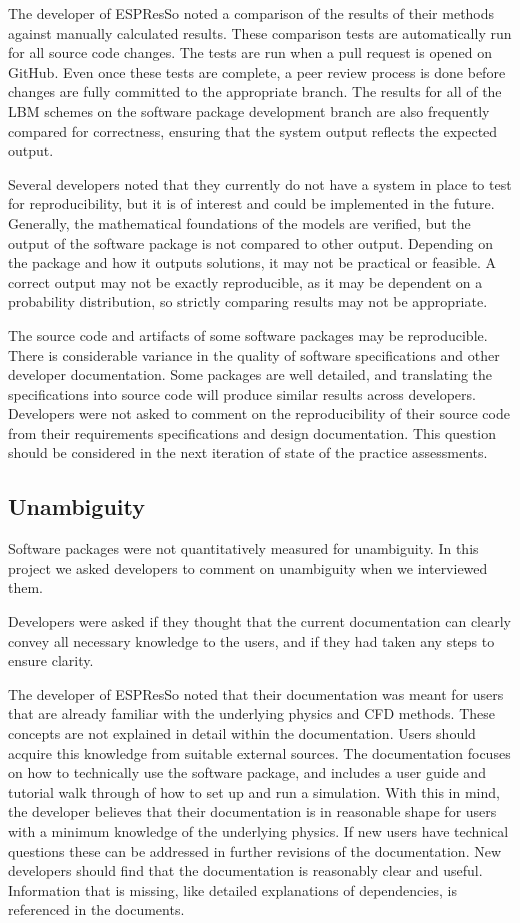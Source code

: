 \documentclass[12pt, notitlepage]{article}
\begin{document}
The developer of ESPResSo noted a comparison of the results of their methods against manually calculated results. These comparison tests are automatically run for all source code changes. The tests are run when a pull request is opened on GitHub. Even once these tests are complete, a peer review process is done before changes are fully committed to the appropriate branch. The results for all of the LBM schemes on the software package development branch are also frequently compared for correctness, ensuring that the system output reflects the expected output.  

Several developers noted that they currently do not have a system in place to test for reproducibility, but it is of interest and could be implemented in the future. Generally, the mathematical foundations of the models are verified, but the output of the software package is not compared to other output. Depending on the package and how it outputs solutions, it may not be practical or feasible. A correct output may not be exactly reproducible, as it may be dependent on a probability distribution, so strictly comparing results may not be appropriate. 

The source code and artifacts of some software packages may be reproducible. There is considerable variance in the quality of software specifications and other developer documentation. Some packages are well detailed, and translating the specifications into source code will produce similar results across developers. Developers were not asked to comment on the reproducibility of their source code from their requirements specifications and design documentation. This question should be considered in the next iteration of state of the practice assessments. 

\subsection{Unambiguity}

Software packages were not quantitatively measured for unambiguity.
In this project we asked developers to comment on unambiguity when we interviewed them.

Developers were asked if they thought that the current documentation can clearly convey all necessary knowledge to the users, and if they had taken any steps to ensure clarity. 

The developer of ESPResSo noted that their documentation was meant for users that are already familiar with the underlying physics and CFD methods. These concepts are not explained in detail within the documentation. Users should acquire this knowledge from suitable external sources. The documentation focuses on how to technically use the software package, and includes a user guide and tutorial walk through of how to set up and run a simulation. With this in mind, the developer believes that their documentation is in reasonable shape for users with a minimum knowledge of the underlying physics. If new users have technical questions these can be addressed in further revisions of the documentation. New developers should find that the documentation is reasonably clear and useful. Information that is missing, like detailed explanations of dependencies, is referenced in the documents. 
\end{document}
